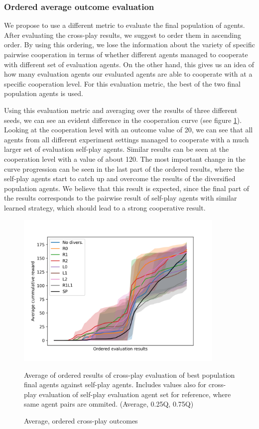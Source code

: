 \subsubsection{Ordered average outcome evaluation}\label{OrderedEvaluation}
We propose to use a different metric to evaluate the final population of agents.
After evaluating the cross-play results, we suggest to order them in ascending order.
By using this ordering, we lose the information about the variety of specific pairwise cooperation in terms of whether different agents managed to cooperate with different set of evaluation agents.
On the other hand, this gives us an idea of how many evaluation agents our evaluated agents are able to cooperate with at a specific cooperation level.
For this evaluation metric, the best of the two final population agents is used.

Using this evaluation metric and averaging over the results of three different seeds, we can see an evident difference in the cooperation curve (see figure \ref{SimpleCNNOrderedAvg}).
Looking at the cooperation level with an outcome value of 20, we can see that all agents from all different experiment settings managed to cooperate with a much larger set of evaluation self-play agents.
Similar results can be seen at the cooperation level with a value of about 120.
The most important change in the curve progression can be seen in the last part of the ordered results, where the self-play agents start to catch up and overcome the results of the diversified population agents.
We believe that this result is expected, since the final part of the results corresponds to the pairwise result of self-play agents with similar learned strategy, which should lead to a strong cooperative result.

\begin{figure}[!ht]
    \centering
    \includegraphics*[width=10cm]{../img/SimpleCNNOrderedAvg.png}

    \caption{Average, ordered cross-play outcomes}
    \label{SimpleCNNOrderedAvg}
    \medskip
    \small 
    Average of ordered results of cross-play evaluation of best population final agents against self-play agents.
    Includes values also for cross-play evaluation of self-play evaluation agent set for reference, where same agent pairs are ommited.
    (Average, 0.25Q, 0.75Q)

\end{figure}

